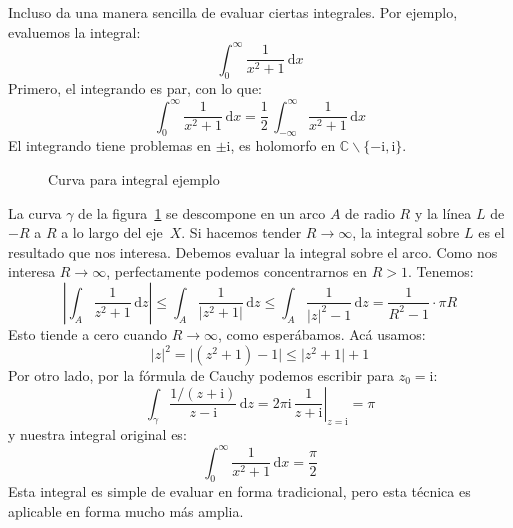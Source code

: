   Incluso da una manera sencilla de evaluar ciertas integrales.
  Por ejemplo,
  evaluemos la integral:
  \begin{equation*}
    \int_0^\infty \frac{1}{x^2 + 1} \, \mathrm{d} x
  \end{equation*}
  Primero,
  el integrando es par,
  con lo que:
  \begin{equation*}
    \int_0^\infty \frac{1}{x^2 + 1} \, \mathrm{d} x
      = \frac{1}{2} \,
	  \int_{- \infty}^\infty \frac{1}{x^2 + 1} \, \mathrm{d} x
  \end{equation*}
  El integrando tiene problemas en \(\pm \mathrm{i}\),
  es holomorfo
  en \(\mathbb{C} \smallsetminus \{- \mathrm{i}, \mathrm{i} \}\).
  \begin{figure}[ht]
    \centering
    \caption{Curva para integral ejemplo}
    \label{fig:example-integral-contour}
  \end{figure}
  La curva \(\gamma\)
  de la figura~\ref{fig:example-integral-contour}
  se descompone en un arco \(A\) de radio \(R\)
  y la línea \(L\) de \(-R\) a \(R\) a lo largo del eje~\(X\).
  Si hacemos tender \(R \rightarrow \infty\),
  la integral sobre \(L\) es el resultado que nos interesa.
  Debemos evaluar la integral sobre el arco.
  Como nos interesa \(R \rightarrow \infty\),
  perfectamente podemos concentrarnos en \(R > 1\).
  Tenemos:
  \begin{equation*}
    \left\lvert
      \int_A \frac{1}{z^2 + 1} \, \mathrm{d} z
    \right\rvert
      \le \int_A \frac{1}{\lvert z^2 + 1 \rvert} \, \mathrm{d} z
      \le \int_A \frac{1}{\lvert z \rvert^2 - 1} \, \mathrm{d} z
      =	  \frac{1}{R^2 - 1} \cdot \pi R
  \end{equation*}
  Esto tiende a cero cuando \(R \rightarrow \infty\),
  como esperábamos.
  Acá usamos:
  \begin{equation*}
    \lvert z \rvert^2
      =	  \lvert (z^2 + 1) - 1 \rvert
      \le \lvert z^2 + 1 \rvert + 1
  \end{equation*}
  Por otro lado,
  por la fórmula de Cauchy%
  podemos escribir para \(z_0 = \mathrm{i}\):
  \begin{equation*}
    \int_\gamma \frac{1 / (z + \mathrm{i})}{z - \mathrm{i}}
	\, \mathrm{d} z
      = \left.
	  2 \pi \mathrm{i} \, \frac{1}{z + \mathrm{i}}
	\right\rvert_{z = \mathrm{i}}
      = \pi
  \end{equation*}
  y nuestra integral original es:
  \begin{equation*}
    \int_0^\infty \frac{1}{x^2 + 1} \, \mathrm{d} x
      = \frac{\pi}{2}
  \end{equation*}
  Esta integral es simple de evaluar en forma tradicional,
  pero esta técnica es aplicable en forma mucho más amplia.

